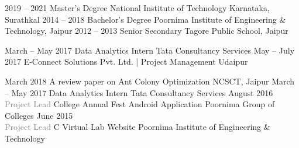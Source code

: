 \documentclass[9pt]{myOwnClass}
\begin{document}

\begin{entrylist}
	\entry
		{2019 -- 2021}
		{Master's Degree}
		{}
		{National Institute of Technology Karnataka, Surathkal}
	\entry
		{2014 -- 2018}
		{Bachelor's Degree}
		{}
		{Poornima Institute of Engineering \& Technology, Jaipur}
	\entry
		{2012 -- 2013}
		{Senior Secondary}
		{}
		{Tagore Public School, Jaipur}
\end{entrylist}


\begin{entrylist}
	\entry
		{March -- May 2017}
		{Data Analytics Intern}
		{}
		{Tata Consultancy Services}
	\entry
		{May -- July 2017}
		{E-Connect Solutions Pvt. Ltd. | Project Management}
		{}
		{Udaipur}
		
\end{entrylist}


\begin{entrylist}
	\entry
		{March 2018}
		{A review paper on Ant Colony Optimization}
		{}
		{NCSCT, Jaipur}
	\entry
		{March -- May 2017}
		{Data Analytics Intern}
		{}
		{Tata Consultancy Services}
	\entry
		{August 2016\\\footnotesize{\textcolor{gray}{Project Lead}}}
		{College Annual Fest Android Application}
		{}
		{Poornima Group of Colleges}
		\entry
		{June 2015\\\footnotesize{\textcolor{gray}{Project Lead}}}
		{C Virtual Lab Website}
		{}
		{Poornima Institute of Engineering \& Technology}
\end{entrylist}
\end{document}
